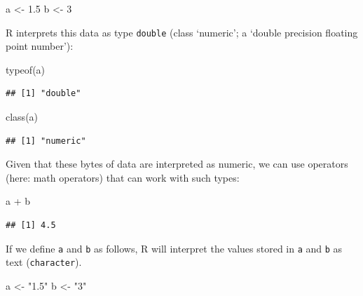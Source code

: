 \documentclass[
  12pt,
]{style/krantz}
\newenvironment{Shaded}{\begin{snugshade}}{\end{snugshade}}
\newcommand{\DecValTok}[1]{\textcolor[rgb]{0.00,0.00,0.81}{#1}}
\newcommand{\FloatTok}[1]{\textcolor[rgb]{0.00,0.00,0.81}{#1}}
\newcommand{\FunctionTok}[1]{\textcolor[rgb]{0.00,0.00,0.00}{#1}}
\newcommand{\NormalTok}[1]{#1}
\newcommand{\OtherTok}[1]{\textcolor[rgb]{0.56,0.35,0.01}{#1}}
\newcommand{\SpecialCharTok}[1]{\textcolor[rgb]{0.00,0.00,0.00}{#1}}
\newcommand{\StringTok}[1]{\textcolor[rgb]{0.31,0.60,0.02}{#1}}
\begin{document}
\begin{Shaded}
\begin{Highlighting}[]
\NormalTok{a }\OtherTok{\textless{}{-}} \FloatTok{1.5}
\NormalTok{b }\OtherTok{\textless{}{-}} \DecValTok{3}
\end{Highlighting}
\end{Shaded}

R interprets this data as type \texttt{double} (class `numeric'; a `double precision floating point number'):

\begin{Shaded}
\begin{Highlighting}[]
\FunctionTok{typeof}\NormalTok{(a)}
\end{Highlighting}
\end{Shaded}

\begin{verbatim}
## [1] "double"
\end{verbatim}

\begin{Shaded}
\begin{Highlighting}[]
\FunctionTok{class}\NormalTok{(a)}
\end{Highlighting}
\end{Shaded}

\begin{verbatim}
## [1] "numeric"
\end{verbatim}

Given that these bytes of data are interpreted as numeric, we can use operators (here: math operators) that can work with such types:

\begin{Shaded}
\begin{Highlighting}[]
\NormalTok{a }\SpecialCharTok{+}\NormalTok{ b}
\end{Highlighting}
\end{Shaded}

\begin{verbatim}
## [1] 4.5
\end{verbatim}

If we define \texttt{a} and \texttt{b} as follows, R will interpret the values stored in \texttt{a} and \texttt{b} as text (\texttt{character}).

\begin{Shaded}
\begin{Highlighting}[]
\NormalTok{a }\OtherTok{\textless{}{-}} \StringTok{"1.5"}
\NormalTok{b }\OtherTok{\textless{}{-}} \StringTok{"3"}
\end{Highlighting}
\end{Shaded}
\end{document}
